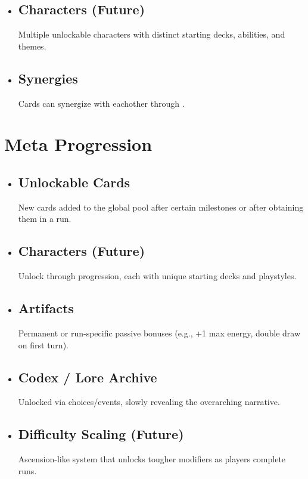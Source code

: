\documentclass[10pt, a4paper]{article}
\begin{document}
\begin{itemize}
		\item \subsection{Characters (Future)} Multiple unlockable characters with distinct starting decks, abilities, and themes.
		
		\item \subsection{Synergies} Cards can synergize with eachother through .
		\end{itemize}
	\section{Meta Progression}
	
	\begin{itemize}
		\item \subsection{Unlockable Cards} New cards added to the global pool after certain milestones or after obtaining them in a run.
		
		\item \subsection{Characters (Future) } Unlock through progression, each with unique starting decks and playstyles.
		
		\item \subsection{Artifacts} Permanent or run-specific passive bonuses (e.g., +1 max energy, double draw on first turn).
		
		\item \subsection{Codex / Lore Archive} Unlocked via choices/events, slowly revealing the overarching narrative.
		
		\item \subsection{Difficulty Scaling (Future)} Ascension-like system that unlocks tougher modifiers as players complete runs.
	\end{itemize}
\end{document}
